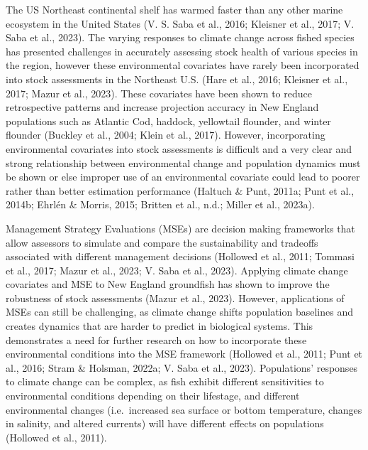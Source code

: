 \documentclass[
  12pt,
]{article}
\begin{document}
The US Northeast continental shelf has warmed faster than any other marine ecosystem in the United States (V. S. Saba et al., 2016; Kleisner et al., 2017; V. Saba et al., 2023). The varying responses to climate change across fished species has presented challenges in accurately assessing stock health of various species in the region, however these environmental covariates have rarely been incorporated into stock assessments in the Northeast U.S. (Hare et al., 2016; Kleisner et al., 2017; Mazur et al., 2023). These covariates have been shown to reduce retrospective patterns and increase projection accuracy in New England populations such as Atlantic Cod, haddock, yellowtail flounder, and winter flounder (Buckley et al., 2004; Klein et al., 2017). However, incorporating environmental covariates into stock assessments is difficult and a very clear and strong relationship between environmental change and population dynamics must be shown or else improper use of an environmental covariate could lead to poorer rather than better estimation performance (Haltuch \& Punt, 2011a; Punt et al., 2014b; Ehrlén \& Morris, 2015; Britten et al., n.d.; Miller et al., 2023a).

Management Strategy Evaluations (MSEs) are decision making frameworks that allow assessors to simulate and compare the sustainability and tradeoffs associated with different management decisions (Hollowed et al., 2011; Tommasi et al., 2017; Mazur et al., 2023; V. Saba et al., 2023). Applying climate change covariates and MSE to New England groundfish has shown to improve the robustness of stock assessments (Mazur et al., 2023). However, applications of MSEs can still be challenging, as climate change shifts population baselines and creates dynamics that are harder to predict in biological systems. This demonstrates a need for further research on how to incorporate these environmental conditions into the MSE framework (Hollowed et al., 2011; Punt et al., 2016; Stram \& Holsman, 2022a; V. Saba et al., 2023). Populations' responses to climate change can be complex, as fish exhibit different sensitivities to environmental conditions depending on their lifestage, and different environmental changes (i.e.~increased sea surface or bottom temperature, changes in salinity, and altered currents) will have different effects on populations (Hollowed et al., 2011).
\end{document}
